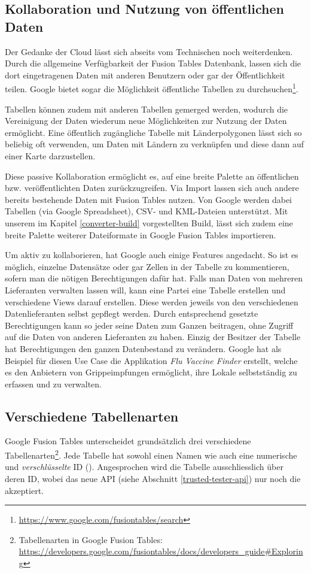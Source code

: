 \subsection{Kollaboration und Nutzung von öffentlichen Daten}
Der Gedanke der \gls{Cloud} lässt sich abseits vom Technischen noch weiterdenken. Durch die allgemeine Verfügbarkeit der Fusion Tables Datenbank, lassen sich die dort eingetragenen Daten mit anderen Benutzern oder gar der Öffentlichkeit teilen. Google bietet sogar die Möglichkeit öffentliche Tabellen zu durchsuchen\footnote{\url{https://www.google.com/fusiontables/search}}.

Tabellen können zudem mit anderen Tabellen gemerged werden, wodurch die Vereinigung der Daten wiederum neue Möglichkeiten zur Nutzung der Daten ermöglicht. Eine öffentlich zugängliche Tabelle mit Länderpolygonen lässt sich so beliebig oft verwenden, um Daten mit Ländern zu verknüpfen und diese dann auf einer Karte darzustellen.

Diese passive Kollaboration ermöglicht es, auf eine breite Palette an öffentlichen bzw. veröffentlichten Daten zurückzugreifen. Via Import lassen sich auch andere bereits bestehende Daten mit Fusion Tables nutzen. Von Google werden dabei Tabellen (via Google Spreadsheet), \gls{CSV}- und \gls{KML}-Dateien unterstützt. Mit unserem im Kapitel \ref{converter-build} vorgestellten Build, lässt sich zudem eine breite Palette weiterer Dateiformate in Google Fusion Tables importieren.

Um aktiv zu kollaborieren, hat Google auch einige Features angedacht. So ist es möglich, einzelne Datensätze oder gar Zellen in der Tabelle zu kommentieren, sofern man die nötigen Berechtigungen dafür hat. Falls man Daten von mehreren Lieferanten verwalten lassen will, kann eine Partei eine Tabelle erstellen und verschiedene Views darauf erstellen. Diese werden jeweils von den verschiedenen Datenlieferanten selbst gepflegt werden. Durch entsprechend gesetzte Berechtigungen kann so jeder seine Daten zum Ganzen beitragen, ohne Zugriff auf die Daten von anderen Lieferanten zu haben. Einzig der Besitzer der Tabelle hat Berechtigungen den ganzen Datenbestand zu verändern. Google hat als Beispiel für diesen Use Case die Applikation \emph{Flu Vaccine Finder} erstellt, welche es den Anbietern von Grippeimpfungen ermöglicht, ihre Lokale selbstständig zu erfassen und zu verwalten.\cite{data-gathering}

\subsection{Verschiedene Tabellenarten}
Google Fusion Tables unterscheidet grundsätzlich drei verschiedene Tabellenarten\footnote{Tabellenarten in Google Fusion Tables: \url{https://developers.google.com/fusiontables/docs/developers_guide\#Exploring}}. Jede Tabelle hat sowohl einen Namen wie auch eine numerische und \emph{verschlüsselte} ID (). Angesprochen wird die Tabelle ausschliesslich über deren ID, wobei das neue \gls{API} (siehe Abschnitt \ref{trusted-tester-api}) nur noch die  akzeptiert.

